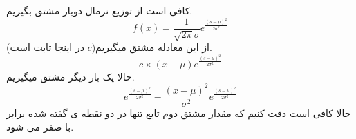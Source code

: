 
کافی است از  توزیع نرمال دوبار مشتق بگیریم.\\
$$f(x) = \frac{1}{\sqrt{2\pi}\sigma}e^{\frac{(s - \mu) ^ 2}{2\sigma ^  2}}$$
از این معادله مشتق میگیریم($c$ در اینجا ثابت است).
$$c \times  (x - \mu)e^{\frac{(s - \mu) ^ 2}{2\sigma ^  2}}$$
حالا یک بار دیگر مشتق میگیریم.
$$e^{\frac{(s - \mu) ^ 2}{2\sigma ^  2}} - \frac{(x - \mu) ^ 2}{\sigma ^ 2}e^{\frac{(s - \mu) ^ 2}{2\sigma ^  2}}$$
حالا کافی است دقت کنیم که مقدار مشتق دوم تابع تنها در دو نقطه ی گفته شده برابر با صفر می شود.